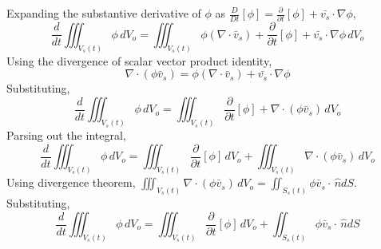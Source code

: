 \documentclass[a4paper, 12pt]{report}
\begin{document}
\begin{center}
Expanding the substantive derivative of $\phi$ as $\displaystyle \frac{D}{Dt}[\phi] = \frac{\partial}{\partial t}[\phi] + \bar{v_{s}}\cdot\nabla\phi$,
$$\frac{d}{dt}\iiint^{}_{V_{s}(t)}\phi \,dV_{o} = \iiint^{}_{V_{s}(t)} \phi(\nabla \cdot\bar{v}_{s}) + \frac{\partial}{\partial t}[\phi] + \bar{v_{s}}\cdot\nabla\phi \,dV_{o}$$
Using the divergence of scalar vector product identity,
$$\nabla \cdot(\phi\bar{v}_{s}) = \phi(\nabla \cdot\bar{v}_{s}) + \bar{v_{s}}\cdot\nabla\phi$$
Substituting,
$$\frac{d}{dt}\iiint^{}_{V_{s}(t)}\phi \,dV_{o} = \iiint^{}_{V_{s}(t)} \frac{\partial}{\partial t}[\phi] + \nabla \cdot(\phi\bar{v}_{s}) \,dV_{o}$$
Parsing out the integral,
$$\frac{d}{dt}\iiint^{}_{V_{s}(t)}\phi \,dV_{o} = \iiint^{}_{V_{s}(t)} \frac{\partial}{\partial t}[\phi] \,dV_{o}  +  \iiint^{}_{V_{s}(t)}\nabla \cdot(\phi\bar{v}_{s}) \,dV_{o}$$
Using divergence theorem, $\displaystyle \iiint^{}_{V_{s}(t)}\nabla \cdot(\phi\bar{v}_{s}) \,dV_{o} = \iint^{}_{S_{s}(t)}\phi\bar{v}_{s} \cdot\,\hat{n}dS$. Substituting,
$$\frac{d}{dt}\iiint^{}_{V_{s}(t)}\phi \,dV_{o} = \iiint^{}_{V_{s}(t)} \frac{\partial}{\partial t}[\phi] \,dV_{o}  +  \iint^{}_{S_{s}(t)}\phi\bar{v}_{s} \cdot\,\hat{n}dS$$

\end{center}
\end{document}

